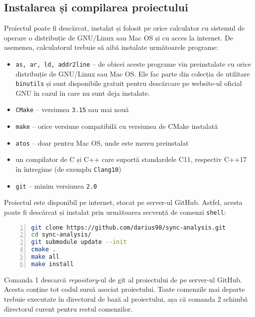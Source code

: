 \subsection{Instalarea și compilarea proiectului}
Proiectul poate fi descărcat, instalat și folosit pe orice calculator cu
sistemul de operare o distribuție de GNU/Linux sau Mac OS și cu acces
la internet. De asemenea, calculatorul trebuie să aibă instalate
următoarele programe:
\begin{itemize}
    \item \lstinline{as, ar, ld, addr2line} -- de obicei aceste programe
    vin preinstalate cu orice distribuție de GNU/Linux sau Mac OS. Ele
    fac parte din colecția de utilitare
    \lstinline{binutils}\cite{binutils} și sunt disponibile gratuit
    pentru descărcare pe website-ul oficial GNU\cite{GNUWebsite} în
    cazul în care nu sunt deja instalate.
    \item \lstinline{CMake}\cite{CMake} -- versiunea \lstinline{3.15}
    sau mai nouă
    \item \lstinline{make} -- orice versiune compatibilă cu versiunea de
    CMake instalată
    \item \lstinline{atos}\cite{atos} -- doar pentru Mac OS, unde este
    mereu preinstalat
    \item un compilator de C și C++ care suportă standardele C11,
    respectiv C++17 în întregime (de exemplu
    \lstinline{Clang10}\cite{Clang})
    \item \lstinline{git}\cite{git} -- minim versiunea \lstinline{2.0}
\end{itemize}

Proiectul este disponibil pe internet, stocat pe server-ul GitHub.
Astfel, acesta poate fi descărcat și instalat prin următoarea secvență
de comenzi \lstinline{shell}:

\begin{lstlisting}[language=bash,
                   numbers=left,
                   xleftmargin=3em,
                   caption=Instrucțiuni pentru instalarea proiectului]
git clone https://github.com/darius98/sync-analysis.git
cd sync-analysis/
git submodule update --init
cmake .
make all
make install
\end{lstlisting}

Comanda 1 descarcă \textit{repository}-ul de git al proiectului de pe
server-ul GitHub. Acesta conține tot codul sursă asociat proiectului.
Toate comenzile mai departe trebuie executate în directorul de bază al
proiectului, așa că comanda 2 schimbă directorul curent pentru restul
comenzilor.

